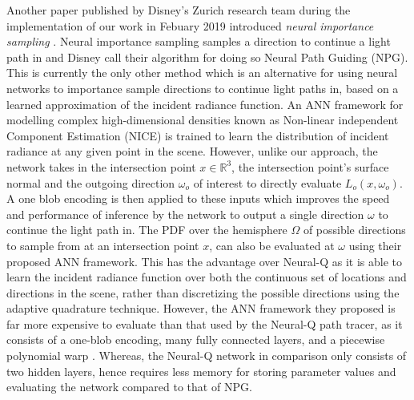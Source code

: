 \documentclass[../dissertation.tex]{subfiles}
\begin{document}
 Another paper published by Disney's Zurich research team during the implementation of our work in Febuary 2019 introduced \textit{neural importance sampling} \cite{muller2018neural}. Neural importance sampling samples a direction to continue a light path in and Disney call their algorithm for doing so Neural Path Guiding (NPG). This is currently the only other method which is an alternative for using neural networks to importance sample directions to continue light paths in, based on a learned approximation of the incident radiance function. An ANN framework for modelling complex high-dimensional densities known as Non-linear independent Component Estimation (NICE) \cite{dinh2014nice} is trained to learn the distribution of incident radiance at any given point in the scene. However, unlike our approach, the network takes in the intersection point $x \in \mathbb{R}^3$, the intersection point's surface normal and the outgoing direction $\omega_o$ of interest to directly evaluate $L_o(x, \omega_o)$. A one blob encoding is then applied to these inputs which improves the speed and performance of inference by the network to output a single direction $\omega$ to continue the light path in. The PDF over the hemisphere $\Omega$ of possible directions to sample from at an intersection point $x$, can also be evaluated at $\omega$ using their proposed ANN framework. This has the advantage over Neural-Q as it is able to learn the incident radiance function over both the continuous set of locations and directions in the scene, rather than discretizing the possible directions using the adaptive quadrature technique. However, the ANN framework they proposed is far more expensive to evaluate than that used by the Neural-Q path tracer, as it consists of a one-blob encoding, many fully connected layers, and a piecewise polynomial warp \cite{muller2018neural}. Whereas, the Neural-Q network in comparison only consists of two hidden layers, hence requires less memory for storing parameter values and evaluating the network compared to that of NPG. 
\end{document}
